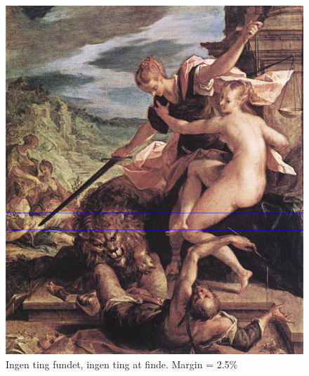 \begin{figure}[h!!]
	\begin{center}
		\includegraphics[scale=0.50,angle=0]{afsnit/afprovning/billeder/BBallegory.png}
	\end{center}
	\caption[]{Ingen ting fundet, ingen ting at finde. Margin = 2.5\%}
	\label{BBallegory}
\end{figure}


